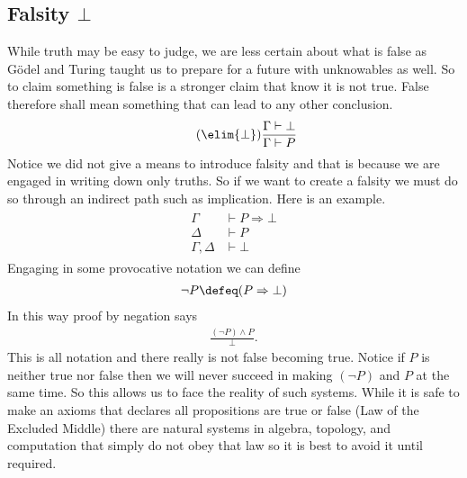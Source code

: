 \subsection{Falsity $\bot$}
While truth may be easy to judge, we are less certain about what is false as 
G\"odel and Turing taught us to prepare for a future with unknowables as well.
So to claim something is false is a stronger claim that know it is not true.
False therefore shall mean something that can lead to any other conclusion.
\begin{align}
    \tag{$\elim{\bot}$}
    \frac{\Gamma\vdash \bot}{\Gamma\vdash P}
\end{align}
Notice we did not give a means to introduce falsity and that is because we 
are engaged in writing down only truths.  So if we want to create a falsity 
we must do so through an indirect path such as implication.  Here is an example.
\begin{align}
    \tag{Proof by negation}
    \begin{array}{rl}
    \Gamma & \vdash P\Rightarrow \bot \\
    \Delta & \vdash P \\
    \hline 
    \Gamma,\Delta & \vdash \bot
    \end{array}
\end{align}
Engaging in some provocative notation we can define 
\begin{align*}
    \neg P \defeq (P\Rightarrow \bot)
\end{align*}
In this way proof by negation says 
\begin{align*}
    \frac{(\neg P)\wedge P}{\bot}.
\end{align*}
This is all notation and there really is not false becoming true.  Notice 
if $P$ is neither true nor false then we will never succeed in making 
$(\neg P)$ and $P$ at the same time.  So this allows us to face the reality 
of such systems.  While it is safe to make an axioms that declares all 
propositions are true or false (Law of the Excluded Middle) there are natural 
systems in algebra, topology, and computation that simply do not obey that law 
so it is best to avoid it until required.

